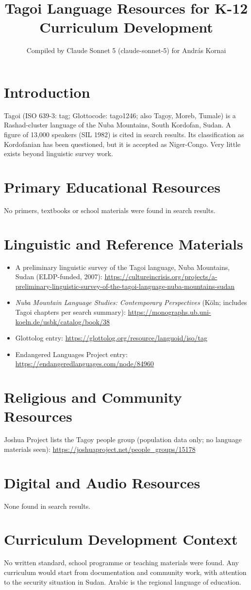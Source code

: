 \documentclass[12pt]{article}
\title{Tagoi Language Resources for K-12 Curriculum Development}
\author{Compiled by Claude Sonnet 5 (claude-sonnet-5) for Andr\'as Kornai}
\date{}
\begin{document}
\maketitle

\section{Introduction}
Tagoi (ISO 639-3: tag; Glottocode: tago1246; also Tagoy, Moreb, Tumale) is a Rashad-cluster language of the Nuba Mountains, South Kordofan, Sudan. A figure of 13,000 speakers (SIL 1982) is cited in search results. Its classification as Kordofanian has been questioned, but it is accepted as Niger-Congo. Very little exists beyond linguistic survey work.

\section{Primary Educational Resources}
No primers, textbooks or school materials were found in search results.

\section{Linguistic and Reference Materials}
\begin{itemize}
\item A preliminary linguistic survey of the Tagoi language, Nuba Mountains, Sudan (ELDP-funded, 2007): \url{https://cultureincrisis.org/projects/a-preliminary-linguistic-survey-of-the-tagoi-language-nuba-mountains-sudan}
\item \emph{Nuba Mountain Language Studies: Contemporary Perspectives} (K\"oln; includes Tagoi chapters per search summary): \url{https://monographs.ub.uni-koeln.de/usbk/catalog/book/38}
\item Glottolog entry: \url{https://glottolog.org/resource/languoid/iso/tag}
\item Endangered Languages Project entry: \url{https://endangeredlanguages.com/node/84960}
\end{itemize}

\section{Religious and Community Resources}
Joshua Project lists the Tagoy people group (population data only; no language materials seen): \url{https://joshuaproject.net/people_groups/15178}

\section{Digital and Audio Resources}
None found in search results.

\section{Curriculum Development Context}
No written standard, school programme or teaching materials were found. Any curriculum would start from documentation and community work, with attention to the security situation in Sudan. Arabic is the regional language of education.
\end{document}
